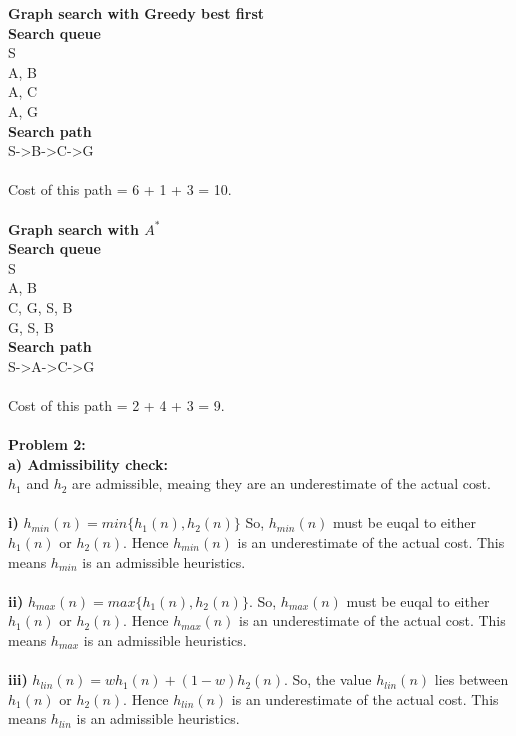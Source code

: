 {\bf Graph search with Greedy best first}\\
{\bf Search queue}\\
S\\
A, B\\
A, C\\
A, G\\
{\bf Search path}\\
S-{\textgreater }B-{\textgreater }C-{\textgreater }G  \\\\
Cost of this path = 6 + 1 + 3 = 10.\\ \\

{\bf Graph search with $A^*$}\\
{\bf Search queue}\\
S\\
A, B\\
C, G, S, B\\
G, S, B\\
{\bf Search path}\\
S-{\textgreater }A-{\textgreater }C-{\textgreater }G  \\\\
Cost of this path = 2 + 4 + 3 = 9.\\ \\

{\bf Problem 2:}\\
{\bf a) Admissibility check:}\\
$h_1$ and $h_2$ are admissible, meaing they are an underestimate of the actual cost.\\ \\

{\bf i)} $h_{min}(n) = min\{{h_1}(n), {h_2}(n)\}$ So, $h_{min}(n)$ must be euqal to either ${h_1}(n)$ or ${h_2}(n)$. Hence $h_{min}(n)$ is an underestimate of the actual cost. This means $h_{min}$ is an admissible heuristics.\\ \\

{\bf ii)} $h_{max}(n) = max\{{h_1}(n), {h_2}(n)\}$. So, $h_{max}(n)$ must be euqal to either ${h_1}(n)$ or ${h_2}(n)$.
Hence $h_{max}(n)$ is an underestimate of the actual cost. This means $h_{max}$ is an admissible heuristics.\\ \\

{\bf iii)} $h_{lin}(n) = w{h_1}(n)+ (1 -w){h_2}(n)$. So, the value $h_{lin}(n)$ lies between ${h_1}(n)$ or ${h_2}(n)$. Hence $h_{lin}(n)$ is an underestimate of the actual cost. This means $h_{lin}$ is an admissible heuristics.\\ \\

